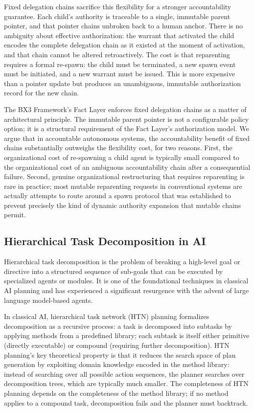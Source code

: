 Fixed delegation chains sacrifice this flexibility for a stronger accountability guarantee. Each child's authority is traceable to a single, immutable parent pointer, and that pointer chains unbroken back to a human anchor. There is no ambiguity about effective authorization: the warrant that activated the child encodes the complete delegation chain as it existed at the moment of activation, and that chain cannot be altered retroactively. The cost is that reparenting requires a formal re-spawn: the child must be terminated, a new spawn event must be initiated, and a new warrant must be issued. This is more expensive than a pointer update but produces an unambiguous, immutable authorization record for the new chain.

The BX3 Framework's Fact Layer enforces fixed delegation chains as a matter of architectural principle. The immutable parent pointer is not a configurable policy option; it is a structural requirement of the Fact Layer's authorization model. We argue that in accountable autonomous systems, the accountability benefit of fixed chains substantially outweighs the flexibility cost, for two reasons. First, the organizational cost of re-spawning a child agent is typically small compared to the organizational cost of an ambiguous accountability chain after a consequential failure. Second, genuine organizational restructuring that requires reparenting is rare in practice; most mutable reparenting requests in conventional systems are actually attempts to route around a spawn protocol that was established to prevent precisely the kind of dynamic authority expansion that mutable chains permit.

\subsection{Hierarchical Task Decomposition in AI}

Hierarchical task decomposition is the problem of breaking a high-level goal or directive into a structured sequence of sub-goals that can be executed by specialized agents or modules. It is one of the foundational techniques in classical AI planning and has experienced a significant resurgence with the advent of large language model-based agents.

In classical AI, hierarchical task network (HTN) planning \cite{erol1994,ghallab2004} formalizes decomposition as a recursive process: a task is decomposed into subtasks by applying methods from a predefined library; each subtask is itself either primitive (directly executable) or compound (requiring further decomposition). HTN planning's key theoretical property is that it reduces the search space of plan generation by exploiting domain knowledge encoded in the method library: instead of searching over all possible action sequences, the planner searches over decomposition trees, which are typically much smaller. The completeness of HTN planning depends on the completeness of the method library; if no method applies to a compound task, decomposition fails and the planner must backtrack.

